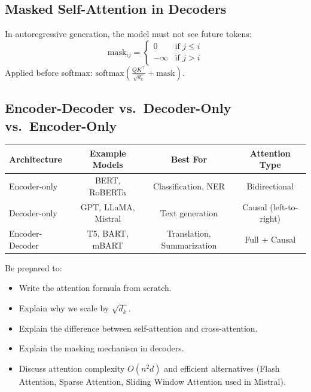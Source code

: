 \documentclass[11pt,a4paper]{article}
\begin{document}
\subsection{Masked Self-Attention in Decoders}
In autoregressive generation, the model must not see future tokens:
\[
\text{mask}_{ij} = \begin{cases} 0 & \text{if } j \leq i \\ -\infty & \text{if } j > i \end{cases}
\]
Applied before softmax: $\text{softmax}\!\left(\frac{QK^\top}{\sqrt{d_k}} + \text{mask}\right)$.

\subsection{Encoder-Decoder vs.\ Decoder-Only vs.\ Encoder-Only}

\begin{center}
\begin{tabular}{lccc}
\toprule
\textbf{Architecture} & \textbf{Example Models} & \textbf{Best For} & \textbf{Attention Type} \\
\midrule
Encoder-only & BERT, RoBERTa & Classification, NER & Bidirectional \\
Decoder-only & GPT, LLaMA, Mistral & Text generation & Causal (left-to-right) \\
Encoder-Decoder & T5, BART, mBART & Translation, Summarization & Full + Causal \\
\bottomrule
\end{tabular}
\end{center}

\begin{tipbox}
Be prepared to:
\begin{itemize}[nosep]
  \item Write the attention formula from scratch.
  \item Explain why we scale by $\sqrt{d_k}$.
  \item Explain the difference between self-attention and cross-attention.
  \item Explain the masking mechanism in decoders.
  \item Discuss attention complexity $O(n^2 d)$ and efficient alternatives (Flash Attention, Sparse Attention, Sliding Window Attention used in Mistral).
\end{itemize}
\end{tipbox}

\end{document}

